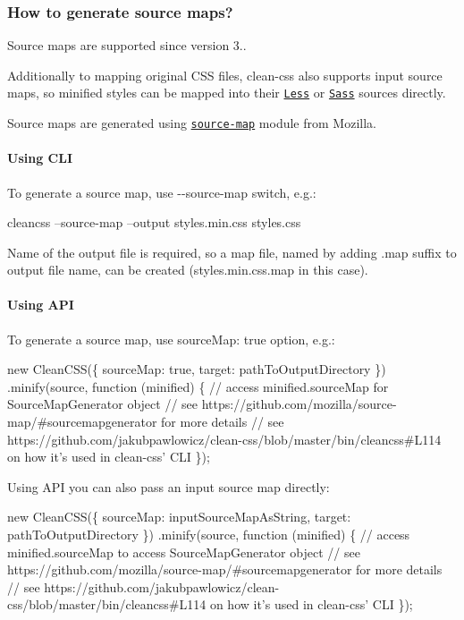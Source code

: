 \subsubsection*{How to generate source maps?}

Source maps are supported since version 3..

Additionally to mapping original C\+SS files, clean-\/css also supports input source maps, so minified styles can be mapped into their \href{http://lesscss.org/}{\tt Less} or \href{http://sass-lang.com/}{\tt Sass} sources directly.

Source maps are generated using \href{https://github.com/mozilla/source-map/}{\tt source-\/map} module from Mozilla.

\paragraph*{Using C\+LI}

To generate a source map, use {\ttfamily -\/-\/source-\/map} switch, e.\+g.\+:


\begin{DoxyCode}
cleancss --source-map --output styles.min.css styles.css
\end{DoxyCode}


Name of the output file is required, so a map file, named by adding {\ttfamily .map} suffix to output file name, can be created (styles.\+min.\+css.\+map in this case).

\paragraph*{Using A\+PI}

To generate a source map, use {\ttfamily source\+Map\+: true} option, e.\+g.\+:


\begin{DoxyCode}
new CleanCSS(\{ sourceMap: true, target: pathToOutputDirectory \})
  .minify(source, function (minified) \{
    // access minified.sourceMap for SourceMapGenerator object
    // see https://github.com/mozilla/source-map/#sourcemapgenerator for more details
    // see https://github.com/jakubpawlowicz/clean-css/blob/master/bin/cleancss#L114 on how it's used in
       clean-css' CLI
\});
\end{DoxyCode}


Using A\+PI you can also pass an input source map directly\+:


\begin{DoxyCode}
new CleanCSS(\{ sourceMap: inputSourceMapAsString, target: pathToOutputDirectory \})
  .minify(source, function (minified) \{
    // access minified.sourceMap to access SourceMapGenerator object
    // see https://github.com/mozilla/source-map/#sourcemapgenerator for more details
    // see https://github.com/jakubpawlowicz/clean-css/blob/master/bin/cleancss#L114 on how it's used in
       clean-css' CLI
\});
\end{DoxyCode}


